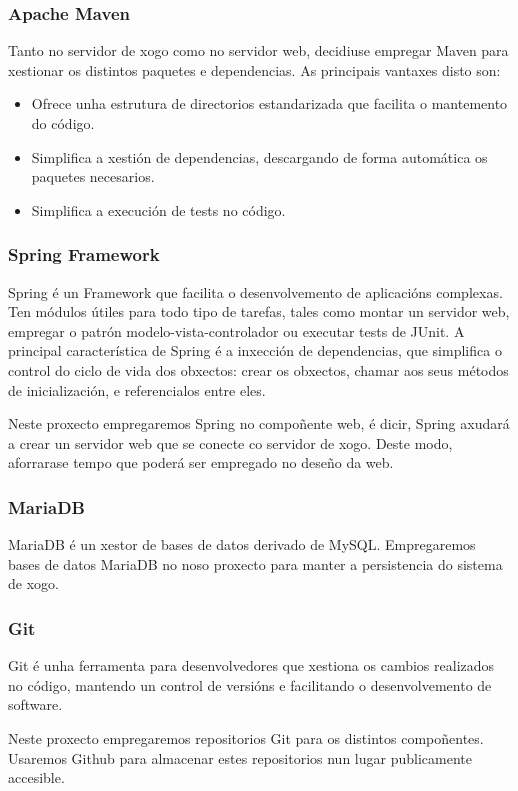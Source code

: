 \subsubsection{Apache Maven}
Tanto no servidor de xogo como no servidor web, decidiuse empregar Maven para
xestionar os distintos paquetes e dependencias. As principais vantaxes disto
son:
\begin{itemize}
  \item Ofrece unha estrutura de directorios estandarizada que facilita o
  mantemento do código.
  \item Simplifica a xestión de dependencias, descargando de forma automática os
  paquetes necesarios.
  \item Simplifica a execución de tests no código.
\end{itemize}

\subsubsection{Spring Framework}
Spring é un Framework que facilita o desenvolvemento de aplicacións complexas.
Ten módulos útiles para todo tipo de tarefas, tales como montar un servidor web,
empregar o patrón modelo-vista-controlador ou executar tests de JUnit. A
principal característica de Spring é a inxección de dependencias, que simplifica
o control do ciclo de vida dos obxectos: crear os obxectos, chamar aos seus
métodos de inicialización, e referencialos entre eles.
\par
Neste proxecto empregaremos Spring no compoñente web, é dicir, Spring axudará a
crear un servidor web que se conecte co servidor de xogo. Deste modo, aforrarase
tempo que poderá ser empregado no deseño da web.

\subsubsection{MariaDB}
MariaDB é un xestor de bases de datos derivado de MySQL. Empregaremos bases de
datos MariaDB no noso proxecto para manter a persistencia do sistema de xogo.

\subsubsection{Git}
Git é unha ferramenta para desenvolvedores que xestiona os cambios realizados no
código, mantendo un control de versións e facilitando o desenvolvemento de
software.
\par
Neste proxecto empregaremos repositorios Git para os distintos compoñentes.
Usaremos Github para almacenar estes repositorios nun lugar publicamente
accesible.

